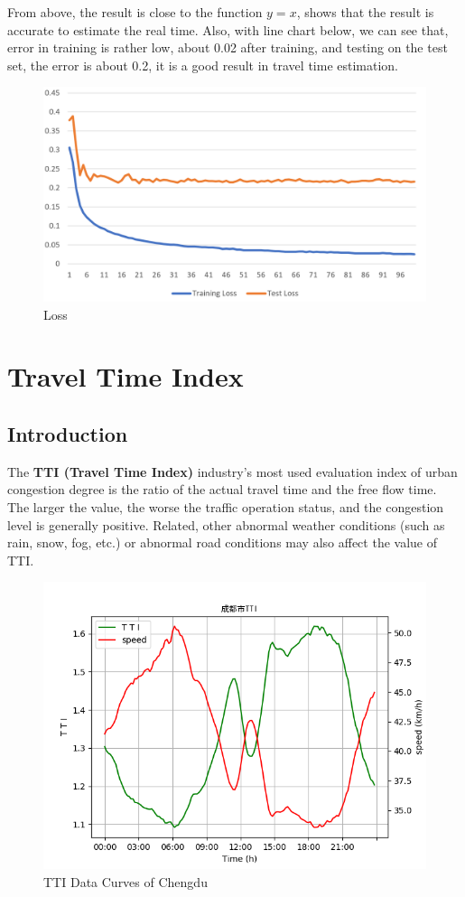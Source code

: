 \documentclass[fontset=none]{ctexart}
\theoremstyle{definition}
\theoremstyle{remark}
\begin{document}
\clearpage
From above, the result is close to the function $y=x$, shows that the result is accurate to estimate the real time. Also, with line chart below, we can see that, error in training is rather low, about 0.02 after training, and testing on the test set, the error is about 0.2, it is a good result in travel time estimation.
\begin{figure}[htb]
  \centering
  \includegraphics[width=\textwidth]{images/loss.png}
  \caption{Loss}
  \label{fig: DeepTTEloss}
\end{figure}

\clearpage
\section{Travel Time Index}
\subsection{Introduction}
The \textbf{TTI (Travel Time Index)} industry's most used evaluation index of urban congestion degree is the ratio of the actual travel time and the free flow time. The larger the value, the worse the traffic operation status, and the congestion level is generally positive. Related, other abnormal weather conditions (such as rain, snow, fog, etc.) or abnormal road conditions may also affect the value of TTI.
\begin{figure}[htb]
  \centering
  \includegraphics[width=\textwidth]{images/chengdutti.png}
  \caption{TTI Data Curves of Chengdu}
  \label{fig: ttieg}
\end{figure}
\end{document}
